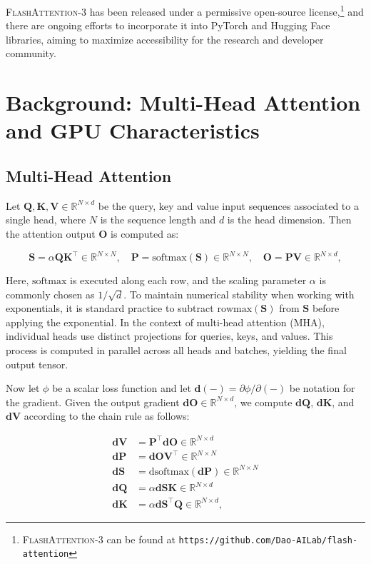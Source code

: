 \begin{enumerate}
\textsc{FlashAttention-3} has been released under a permissive open-source license,\footnote{\textsc{FlashAttention-3} can be found at \texttt{https://github.com/Dao-AILab/flash-attention}} and there are ongoing efforts to incorporate it into PyTorch and Hugging Face libraries, aiming to maximize accessibility for the research and developer community.

\section{Background: Multi-Head Attention and GPU Characteristics}
\label{sec:background}

\subsection{Multi-Head Attention}
\label{subsec:multi_head_attn}

Let $\mathbf{Q}, \mathbf{K}, \mathbf{V} \in \mathbb{R}^{N \times d}$ be the query, key and value input sequences associated to a single head, where $N$ is the sequence length and $d$ is the head dimension. Then the attention output $\mathbf{O}$ is computed as:

\begin{equation*}
  \mathbf{S} = \alpha \mathbf{Q} \mathbf{K}^\top \in \mathbb{R}^{N \times N}, \quad \mathbf{P} = \mathrm{softmax}(\mathbf{S}) \in \mathbb{R}^{N \times N}, \quad \mathbf{O} = \mathbf{P}\mathbf{V} \in \mathbb{R}^{N \times d},
\end{equation*}

Here, $\mathrm{softmax}$ is executed along each row, and the scaling parameter $\alpha$ is commonly chosen as $1/\sqrt{d}$. To maintain numerical stability when working with exponentials, it is standard practice to subtract $\mathrm{rowmax}(\mathbf{S})$ from $\mathbf{S}$ before applying the exponential. In the context of multi-head attention (MHA), individual heads use distinct projections for queries, keys, and values. This process is computed in parallel across all heads and batches, yielding the final output tensor.

Now let $\phi$ be a scalar loss function and let $\mathbf{d}(-) = \partial \phi / \partial (-)$ be notation for the gradient. Given the output gradient $\mathbf{dO} \in \mathbb{R}^{N \times d}$, we compute $\mathbf{dQ}$, $\mathbf{dK}$, and $\mathbf{dV}$ according to the chain rule as follows:

\begin{align*}
  \mathbf{dV} &= \mathbf{P}^\top \mathbf{dO} \in \mathbb{R}^{N \times d} \\
  \mathbf{dP} &= \mathbf{dO} \mathbf{V}^\top \in \mathbb{R}^{N \times N} \\
  \mathbf{dS} &= \mathrm{dsoftmax} (\mathbf{dP}) \in \mathbb{R}^{N \times N} \\
  \mathbf{dQ} &= \alpha \mathbf{dS} \mathbf{K} \in \mathbb{R}^{N \times d} \\
  \mathbf{dK} &= \alpha \mathbf{dS}^\top \mathbf{Q} \in \mathbb{R}^{N \times d},
\end{align*}


\end{enumerate}
